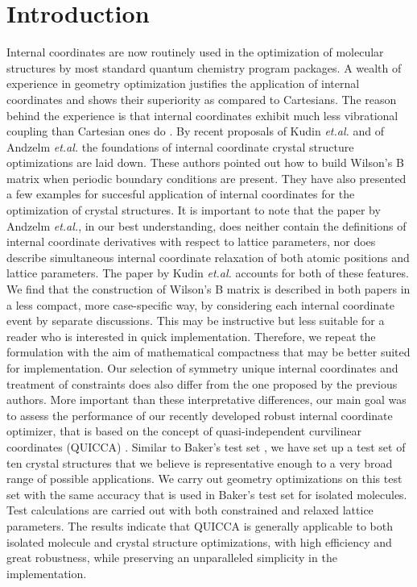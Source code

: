 \documentclass[prl,aps,preprint,superbib,12pt]{revtex4}
\begin{document}
\section{Introduction}
Internal coordinates are now routinely used in the optimization of 
molecular structures by most standard quantum chemistry program 
packages. A wealth of experience in geometry optimization justifies
the application of internal coordinates and shows their
superiority as compared to Cartesians. The reason behind the
experience is that internal coordinates exhibit much less
vibrational coupling than Cartesian ones do 
\cite{PPulay69,GFogarasi79,GFogarasi92,PPulay77}.
By recent proposals of Kudin {\it et.al.} \cite{KKudin01} and of
Andzelm {\it et.al.} \cite{JAndzelm01} the foundations of 
internal coordinate
crystal structure optimizations are laid down. These authors
pointed out how to build Wilson's B matrix \cite{EWilson55} 
when periodic boundary conditions are present. They have also
presented a few examples for succesful application of internal 
coordinates for the optimization of crystal structures. It is 
important to note that the paper by Andzelm {\it et.al.}, in our best
understanding, does neither contain the definitions of 
internal coordinate derivatives with respect to lattice parameters,
nor does describe simultaneous internal coordinate relaxation
of both atomic positions and lattice parameters.
The paper by Kudin {\it et.al.} accounts for both of these
features. We find that the construction of Wilson's B matrix
is described in both papers in a less compact, more case-specific 
way, by considering each internal coordinate event by separate 
discussions. This may be instructive but less suitable for
a reader who is interested in quick implementation.
Therefore, we repeat the formulation with the aim of mathematical
compactness that may be better suited for implementation.
Our selection of symmetry unique internal coordinates and treatment
of constraints does also differ from the one proposed by the previous
authors.
More important than these interpretative differences,
our main goal was to
assess the performance of our recently developed robust internal
coordinate optimizer, that is based on the concept of
quasi-independent curvilinear coordinates (QUICCA) \cite{KNemeth04}.
Similar to Baker's test set \cite{JBaker93}, we have set up 
a test set of ten crystal structures that we believe is representative
enough to a very broad range of possible applications. We carry out
geometry optimizations on this test set with the same accuracy
that is used in Baker's test set for isolated molecules.
Test calculations are carried out with both constrained and
relaxed lattice parameters. The results indicate that
QUICCA is generally applicable to both isolated molecule and crystal
structure optimizations, with high efficiency and great robustness,
while preserving an unparalleled simplicity in the implementation.
\end{document}
